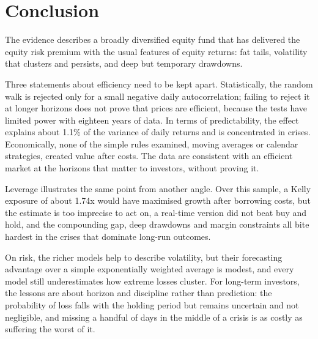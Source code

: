 \documentclass[11pt,a4paper]{article}
\newcommand{\keep}[1]{\Needspace{#1\baselineskip}}
\begin{document}
\keep{12}
\section{Conclusion}
The evidence describes a broadly diversified equity fund that has delivered the equity risk premium with the usual features of equity returns: fat tails, volatility that clusters and persists, and deep but temporary drawdowns.

Three statements about efficiency need to be kept apart. Statistically, the random walk is rejected only for a small negative daily autocorrelation; failing to reject it at longer horizons does not prove that prices are efficient, because the tests have limited power with eighteen years of data. In terms of predictability, the effect explains about 1.1\% of the variance of daily returns and is concentrated in crises. Economically, none of the simple rules examined, moving averages or calendar strategies, created value after costs. The data are consistent with an efficient market at the horizons that matter to investors, without proving it.

Leverage illustrates the same point from another angle. Over this sample, a Kelly exposure of about 1.74x would have maximised growth after borrowing costs, but the estimate is too imprecise to act on, a real-time version did not beat buy and hold, and the compounding gap, deep drawdowns and margin constraints all bite hardest in the crises that dominate long-run outcomes.

On risk, the richer models help to describe volatility, but their forecasting advantage over a simple exponentially weighted average is modest, and every model still underestimates how extreme losses cluster. For long-term investors, the lessons are about horizon and discipline rather than prediction: the probability of loss falls with the holding period but remains uncertain and not negligible, and missing a handful of days in the middle of a crisis is as costly as suffering the worst of it.
\end{document}
